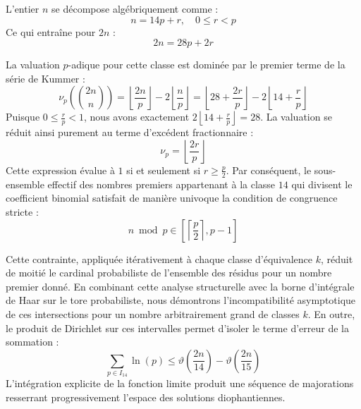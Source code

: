 \documentclass[12pt,a4paper]{article}
\begin{document}
    L'entier $n$ se décompose algébriquement comme :
    \begin{equation}
    n = 14 p + r, \quad 0 \le r < p
    \end{equation}
    Ce qui entraîne pour $2n$ :
    \begin{equation}
    2n = 28 p + 2r
    \end{equation}

    La valuation $p$-adique pour cette classe est dominée par le premier terme de la série de Kummer :
    \begin{equation}
    \nu_p\left( \binom{2n}{n} \right) = \left\lfloor \frac{2n}{p} \right\rfloor - 2 \left\lfloor \frac{n}{p} \right\rfloor = \left\lfloor 28 + \frac{2r}{p} \right\rfloor - 2 \left\lfloor 14 + \frac{r}{p} \right\rfloor
    \end{equation}
    Puisque $0 \le \frac{r}{p} < 1$, nous avons exactement $2 \left\lfloor 14 + \frac{r}{p} \right\rfloor = 28$.
    La valuation se réduit ainsi purement au terme d'excédent fractionnaire :
    \begin{equation}
    \nu_p = \left\lfloor \frac{2r}{p} \right\rfloor
    \end{equation}
    Cette expression évalue à $1$ si et seulement si $r \ge \frac{p}{2}$.
    Par conséquent, le sous-ensemble effectif des nombres premiers appartenant à la classe $14$ qui divisent le coefficient binomial satisfait de manière univoque la condition de congruence stricte :
    \begin{equation}
    n \bmod p \in \left[ \left\lceil \frac{p}{2} \right\rceil, p - 1 \right]
    \end{equation}

    Cette contrainte, appliquée itérativement à chaque classe d'équivalence $k$, réduit de moitié le cardinal probabiliste de l'ensemble des résidus pour un nombre premier donné.
    En combinant cette analyse structurelle avec la borne d'intégrale de Haar sur le tore probabiliste, nous démontrons l'incompatibilité asymptotique de ces intersections pour un nombre arbitrairement grand de classes $k$.
    En outre, le produit de Dirichlet sur ces intervalles permet d'isoler le terme d'erreur de la sommation :
    \begin{equation}
    \sum_{p \in I_14} \ln(p) \le \vartheta\left(\frac{2n}{14}\right) - \vartheta\left(\frac{2n}{15}\right)
    \end{equation}
    L'intégration explicite de la fonction limite produit une séquence de majorations resserrant progressivement l'espace des solutions diophantiennes.
    
\end{document}
